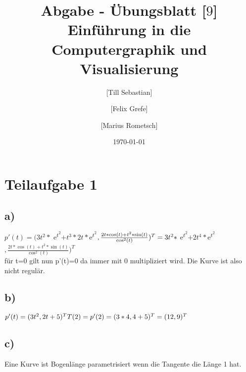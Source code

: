 \documentclass[10pt,a4paper]{article}
\begin{document}
\title{Abgabe - Übungsblatt [$9$]\\
\small{Einführung in die Computergraphik und Visualisierung}}
\author{ [Till Sebastian] \and [Felix Grefe] \and [Marius Rometsch]}
\date{\today}
\maketitle



\section*{Teilaufgabe 1}
\subsection*{a)}
$p'(t)=(3t^2* $ e\textsuperscript{$t^2$}$+t^3 *2t*$e\textsuperscript{$t^2$}$ ,\frac{2t*\cos (t)+t^2*\sin (t)}{\cos ^2 (t)})^T
\\=3t^2* $ e\textsuperscript{$t^2$}$+2t^4 *$e\textsuperscript{$t^2$}$ ,\frac{2t*\cos (t)+t^2*\sin (t)}{\cos ^2 (t)})^T
$
\\für t=0 gilt nun p'(t)=0 da immer mit 0 multipliziert wird.
Die Kurve ist also nicht regulär.
\subsection*{b)}

$p'(t)=(3t^2,2t+5)^T
\\T(2)=p'(2)=(3*4,4+5)^T=(12,9)^T
$
\subsection*{c)}
Eine Kurve ist Bogenlänge parametrisiert wenn die Tangente die Länge 1 hat.
\end{document}
